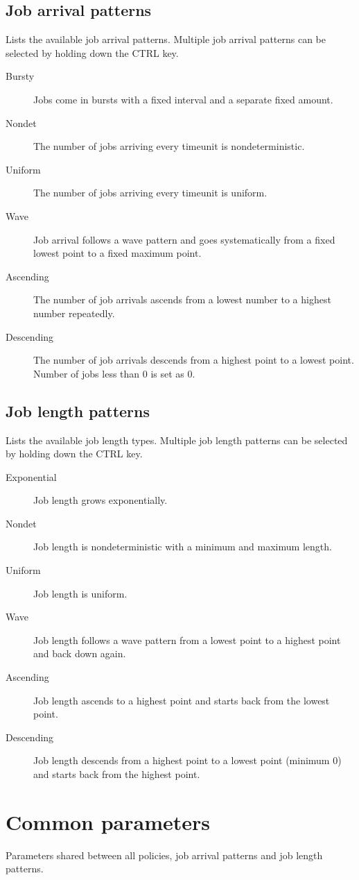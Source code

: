 \documentclass[11pt,oneside,a4paper]{article}
\begin{document}
\subsection{Job arrival patterns}
Lists the available job arrival patterns. Multiple job arrival patterns can be selected by holding down the CTRL key.
\begin{description}
\item[Bursty] Jobs come in bursts with a fixed interval and a separate fixed amount.
\item[Nondet] The number of jobs arriving every timeunit is nondeterministic.
\item[Uniform] The number of jobs arriving every timeunit is uniform.
\item[Wave] Job arrival follows a wave pattern and goes systematically from a fixed lowest point to a fixed maximum point.
\item[Ascending] The number of job arrivals ascends from a lowest number to a highest number repeatedly.
\item[Descending] The number of job arrivals descends from a highest point to a lowest point. Number of jobs less than 0 is set as 0.
\end{description}
\subsection{Job length patterns}
Lists the available job length types. Multiple job length patterns can be selected by holding down the CTRL key.
\begin{description}
\item[Exponential] Job length grows exponentially.
\item[Nondet] Job length is nondeterministic with a minimum and maximum length.
\item[Uniform] Job length is uniform.
\item[Wave] Job length follows a wave pattern from  a lowest point to a highest point and back down again.
\item[Ascending] Job length ascends to a highest point and starts back from the lowest point.
\item[Descending] Job length descends from a highest point to a lowest point (minimum 0) and starts back from the highest point.
\end{description}

\section{Common parameters}
Parameters shared between all policies, job arrival patterns and job length patterns.
\end{document}
